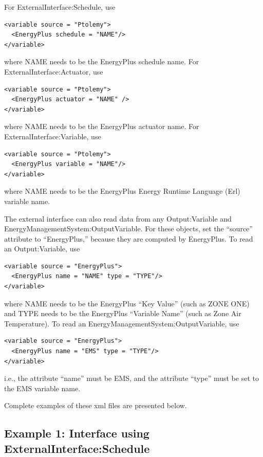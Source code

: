For ExternalInterface:Schedule, use

\begin{lstlisting}
<variable source = "Ptolemy">
  <EnergyPlus schedule = "NAME"/>
</variable>
\end{lstlisting}

where NAME needs to be the EnergyPlus schedule name. For ExternalInterface:Actuator, use

\begin{lstlisting}
<variable source = "Ptolemy">
  <EnergyPlus actuator = "NAME" />
</variable>
\end{lstlisting}

where NAME needs to be the EnergyPlus actuator name. For ExternalInterface:Variable, use

\begin{lstlisting}
<variable source = "Ptolemy">
  <EnergyPlus variable = "NAME"/>
</variable>
\end{lstlisting}

where NAME needs to be the EnergyPlus Energy Runtime Language (Erl) variable name.

The external interface can also read data from any Output:Variable and EnergyManagementSystem:OutputVariable. For these objects, set the ``source'' attribute to ``EnergyPlus,'' because they are computed by EnergyPlus. To read an Output:Variable, use

\begin{lstlisting}
<variable source = "EnergyPlus">
  <EnergyPlus name = "NAME" type = "TYPE"/>
</variable>
\end{lstlisting}

where NAME needs to be the EnergyPlus ``Key Value'' (such as ZONE ONE) and TYPE needs to be the EnergyPlus ``Variable Name'' (such as Zone Air Temperature). To read an EnergyManagementSystem:OutputVariable, use

\begin{lstlisting}
<variable source = "EnergyPlus">
  <EnergyPlus name = "EMS" type = "TYPE"/>
</variable>
\end{lstlisting}

i.e., the attribute ``name'' must be EMS, and the attribute ``type'' must be set to the EMS variable name.

Complete examples of these xml files are presented below.

\subsection{Example 1: Interface using ExternalInterface:Schedule}\label{example-1-interface-using-externalinterfaceschedule}

